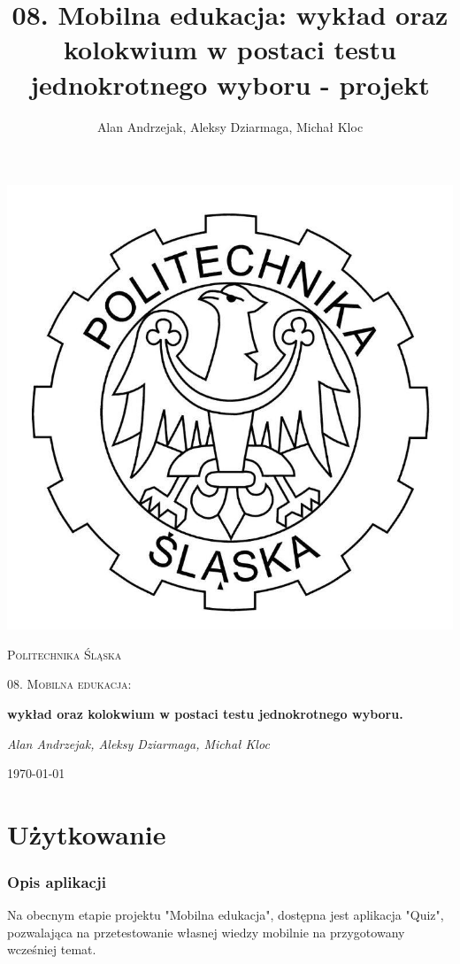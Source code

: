 \documentclass[12pt, a4paper]{article}
\title{08. Mobilna edukacja: wykład oraz kolokwium w postaci testu jednokrotnego wyboru - projekt}
\author{Alan Andrzejak, Aleksy Dziarmaga, Michał Kloc}
\date{}
\begin{document}
\begin{titlepage}
	\centering
	\includegraphics[scale=0.2]{imgs/logo_polsl.jpg}\par\vspace{1cm}
	{\scshape\LARGE Politechnika Śląska \par}
	\vspace{1cm}
	{\scshape\Large 08. Mobilna edukacja:\par}
	\vspace{1.5cm}
	{\huge\bfseries wykład oraz kolokwium w postaci testu jednokrotnego wyboru.\par}
	\vspace{2cm}
	{\Large\itshape Alan Andrzejak, Aleksy Dziarmaga, Michał Kloc\par}
	\vfill
	{\large \today\par}
\end{titlepage}
\tableofcontents
\setcounter{page}{0}
\newpage
\part{Użytkowanie}
\section{Opis aplikacji}
Na obecnym etapie projektu "Mobilna edukacja", dostępna jest aplikacja "Quiz", pozwalająca na przetestowanie własnej wiedzy mobilnie na przygotowany wcześniej temat.
\end{document}
